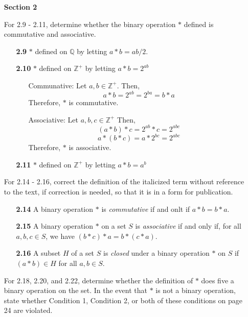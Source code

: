 \documentclass[11pt]{article}
\theoremstyle{plain}
\theoremstyle{definition}
\newcommand{\Q}{\mathbb{Q}}
\newcommand{\Zplus}{\mathbb{Z^+}}
\begin{document}
\begin{enumerate}
\item[\textbf{Section 2}]

    For 2.9 - 2.11, determine whether the binary operation $*$ defined is commutative and associative.
    \begin{enumerate}
        \item[\textbf{2.9}] $*$ defined on $\Q$ by letting $a*b = ab/2$.
        
        \item[\textbf{2.10}] $*$ defined on $\Zplus$ by letting $a*b = 2^{ab}$ 
        	\begin{enumerate}
        		\item [Communative:]
        			Let $a,b \in \Zplus$. Then,
        				\[a*b=2^{ab}=2^{ba}=b*a\]
        			Therefore, $*$ is commutative.
        		\item[Associative:]
        			Let $a,b,c \in \Zplus$ Then,
        				\[(a*b)*c = 2^{ab}*c = 2^{abc}\]
        				\[a*(b*c)= a*2^{bc}=2^{abc}\]
        			Therefore, $*$ is associative.
        	\end{enumerate}
        	
        \item[\textbf{2.11}] $*$ defined on $\Zplus$ by letting $a * b = a^b$
        
    \end{enumerate}
    For 2.14 - 2.16, correct the definition of the italicized term without reference to the text, if correction is needed, so that it is in a form for publication.
    \begin{enumerate}
       
        \item[\textbf{2.14}] A binary operation $*$ is \textit{commutative} if and onlt if $a*b = b*a$.
        
        \item[\textbf{2.15}] A binary operation $*$ on a set $S$ is \textit{associative} if and only if, for all $a,b,c\in S$, we have $(b*c)*a = b*(c*a)$.
        
        \item[\textbf{2.16}] A subset $H$ of a set $S$ is \textit{closed} under a binary operation $*$ on $S$ if $(a*b) \in H$ for all $a,b \in S$.
        
    \end{enumerate}
    
    For 2.18, 2.20, and 2.22, determine whether the definition of $*$ does five a binary operation on the set. In the event that $*$ is not a binary operation, state whether Condition 1, Condition 2, or both of these conditions on page 24 are violated.\\
    

\end{enumerate}
\end{document}
